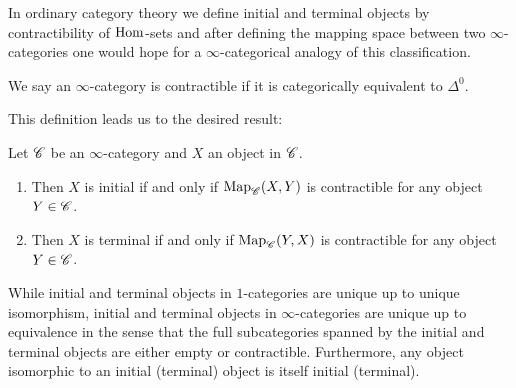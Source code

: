 \documentclass[../../thesis.tex]{subfiles}
\begin{document}
In ordinary category theory we define initial and terminal objects by contractibility of $\mathrm{Hom}$-sets and after defining the mapping space between two $\infty$-categories one would hope for a $\infty$-categorical analogy of this classification.
\begin{definition}
    We say an $\infty$-category is contractible if it is categorically equivalent to $\Delta^0$.
\end{definition}
This definition leads us to the desired result:
\begin{proposition}
    Let $\mathscr{C}$ be an $\infty$-category and $X$ an object in $\mathscr{C}$.
    \begin{enumerate}
        \item Then $X$ is initial if and only if $\mathrm{Map}_{\mathscr{C}}(X,Y)$ is contractible for any object $Y\in \mathscr{C}$.
        \item Then $X$ is terminal if and only if $\mathrm{Map}_{\mathscr{C}}(Y,X)$ is contractible for any object $Y\in \mathscr{C}$.
    \end{enumerate}
\end{proposition}
While initial and terminal objects in $1$-categories are unique up to unique isomorphism, initial and terminal objects in $\infty$-categories are unique up to equivalence in the sense that the full subcategories spanned by the initial and terminal objects are either empty or contractible.
Furthermore, any object isomorphic to an initial (terminal) object is itself initial (terminal).
\end{document}
